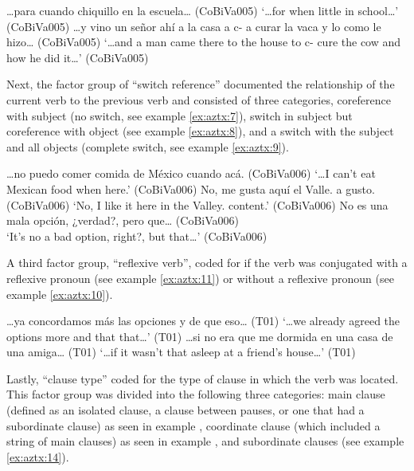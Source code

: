 \documentclass[output=paper]{langscibook}
\begin{document}
\ea\label{ex:aztx:5} …para cuando { } chiquillo en la escuela… (CoBiVa005)
 \glt `…for when { } little in school…' (CoBiVa005)
\ex\label{ex:aztx:6} …y vino un señor ahí a la casa a c- a curar la vaca y lo {{} } como le hizo… (CoBiVa005)
 \glt `…and a man came there to the house to c- cure the cow and {{} } how he did it…' (CoBiVa005)
\z 

Next, the factor group of “switch reference” documented the relationship of the current verb to the previous verb and consisted of three categories, coreference with subject (no switch, see example \ref{ex:aztx:7}), switch in subject but coreference with object (see example \ref{ex:aztx:8}), and a switch with the subject and all objects (complete switch, see example \ref{ex:aztx:9}). 

\ea\label{ex:aztx:7}…no puedo comer comida de México cuando {{} } acá. (CoBiVa006)
 \glt ‘…I can’t eat Mexican food when {{} } here.’ (CoBiVa006)
\ex\label{ex:aztx:8}No, me gusta aquí el Valle. {{} } a gusto. (CoBiVa006)
\glt ‘No, I like it here in the Valley. {{} } content.’ (CoBiVa006)
\ex\label{ex:aztx:9}No es una mala opción, ¿verdad?, pero { } que… (CoBiVa006)\\
 \glt ‘It’s no a bad option, right?, but { } that…’ (CoBiVa006)
\z 

A third factor group, “reflexive verb”, coded for if the verb was conjugated with a reflexive pronoun (see example \ref{ex:aztx:11}) or without a reflexive pronoun (see example \ref{ex:aztx:10}).\largerpage

\ea\label{ex:aztx:10}…ya concordamos más las opciones y de que {{}   } eso… (T01)
\glt ‘…we already agreed the options more and that {{}    } that…’ (T01)
\ex\label{ex:aztx:11}…si no era que me \underline{{} } dormida en una casa de una amiga… (T01)
 \glt ‘…if it wasn’t that {{} } asleep at a friend’s house…’ (T01)
\z 

Lastly, “clause type” coded for the type of clause in which the verb was located. This factor group was divided into the following three categories: main clause (defined as an isolated clause, a clause between pauses, or one that had a subordinate clause) as seen in example , coordinate clause (which included a string of main clauses) as seen in example  , and subordinate clauses (see example \ref{ex:aztx:14}).
\end{document}
